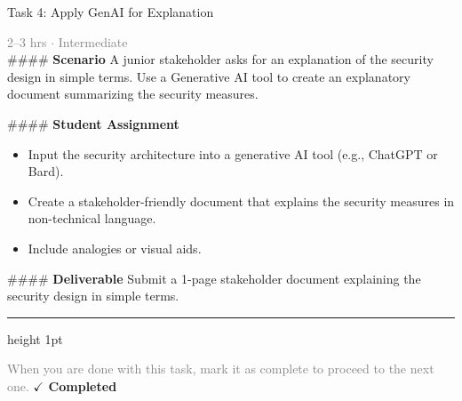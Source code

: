 \documentclass[10pt,a4paper]{article}
\begin{document}
\begin{taskbox}{Task 4: Apply GenAI for Explanation}

    {\small \textcolor{gray}{2--3 hrs $\cdot$ Intermediate}}\\[12pt]

    \#\#\#\# \textbf{Scenario}
A junior stakeholder asks for an explanation of the security design in simple terms. Use a Generative AI tool to create an explanatory document summarizing the security measures.

\#\#\#\# \textbf{Student Assignment}
\begin{itemize}
    \item Input the security architecture into a generative AI tool (e.g., ChatGPT or Bard).
    \item Create a stakeholder-friendly document that explains the security measures in non-technical language.
    \item Include analogies or visual aids.
\end{itemize}

\#\#\#\# \textbf{Deliverable}
Submit a 1-page stakeholder document explaining the security design in simple terms.\par

    \vspace{16pt}

    \textcolor{cardBorder}{\hrule height 1pt}\vspace{8pt}

    \small \textcolor{gray}{When you are done with this task, mark it as complete to proceed to the next one.} \hfill \textbf{\textcolor{brandDark}{$\checkmark$ Completed}}

\end{taskbox}
\end{document}
